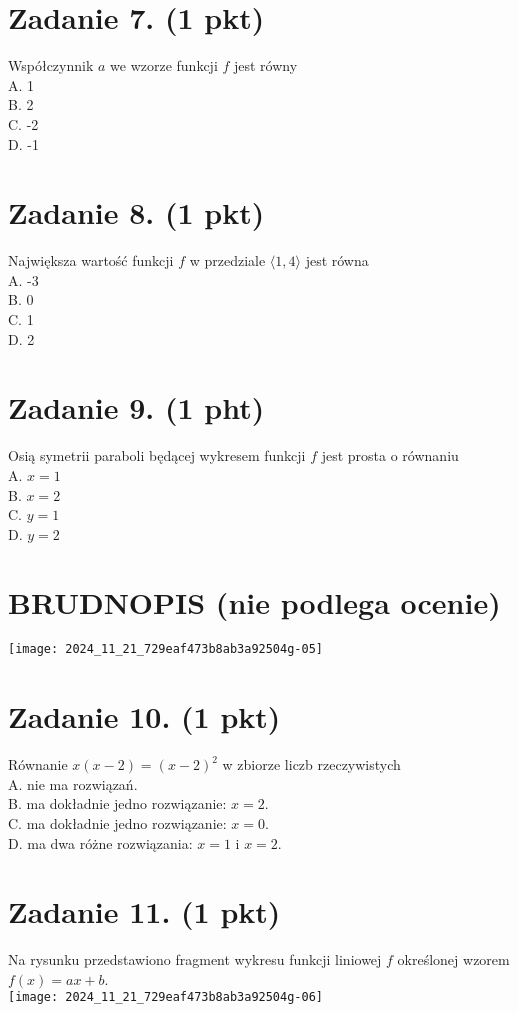 \documentclass[10pt]{article}
\begin{document}
\section*{Zadanie 7. (1 pkt)}
Współczynnik \(a\) we wzorze funkcji \(f\) jest równy\\
A. 1\\
B. 2\\
C. -2\\
D. -1

\section*{Zadanie 8. (1 pkt)}
Największa wartość funkcji \(f\) w przedziale \(\langle 1,4\rangle\) jest równa\\
A. -3\\
B. 0\\
C. 1\\
D. 2

\section*{Zadanie 9. (1 pht)}
Osią symetrii paraboli będącej wykresem funkcji \(f\) jest prosta o równaniu\\
A. \(x=1\)\\
B. \(x=2\)\\
C. \(y=1\)\\
D. \(y=2\)

\section*{BRUDNOPIS (nie podlega ocenie)}
\begin{center}
\texttt{[image: 2024\_11\_21\_729eaf473b8ab3a92504g-05]}
\end{center}

\section*{Zadanie 10. (1 pkt)}
Równanie \(x(x-2)=(x-2)^{2}\) w zbiorze liczb rzeczywistych\\
A. nie ma rozwiązań.\\
B. ma dokładnie jedno rozwiązanie: \(x=2\).\\
C. ma dokładnie jedno rozwiązanie: \(x=0\).\\
D. ma dwa różne rozwiązania: \(x=1\) i \(x=2\).

\section*{Zadanie 11. (1 pkt)}
Na rysunku przedstawiono fragment wykresu funkcji liniowej \(f\) określonej wzorem \(f(x)=a x+b\).\\
\texttt{[image: 2024\_11\_21\_729eaf473b8ab3a92504g-06]}
\end{document}
